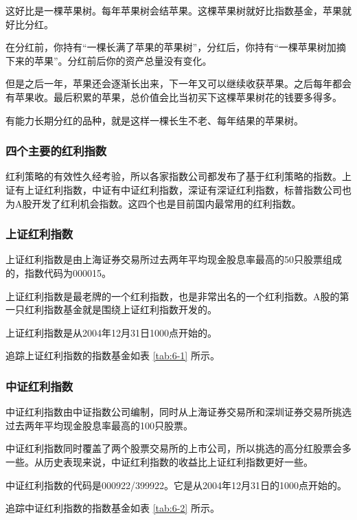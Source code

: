 这好比是一棵苹果树。每年苹果树会结苹果。这棵苹果树就好比指数基金，苹果就好比分红。

在分红前，你持有“一棵长满了苹果的苹果树”，分红后，你持有“一棵苹果树加摘下来的苹果”。分红前后你的资产总量没有变化。

但是之后一年，苹果还会逐渐长出来，下一年又可以继续收获苹果。之后每年都会有苹果收。最后积累的苹果，总价值会比当初买下这棵苹果树花的钱要多得多。

有能力长期分红的品种，就是这样一棵长生不老、每年结果的苹果树。

\subsubsection{四个主要的红利指数}

红利策略的有效性久经考验，所以各家指数公司都发布了基于红利策略的指数。上证有上证红利指数，中证有中证红利指数，深证有深证红利指数，标普指数公司也为A股开发了红利机会指数。这四个也是目前国内最常用的红利指数。

\subsubsection{上证红利指数}

上证红利指数是由上海证券交易所过去两年平均现金股息率最高的50只股票组成的，指数代码为000015。

上证红利指数是最老牌的一个红利指数，也是非常出名的一个红利指数。A股的第一只红利指数基金就是围绕上证红利指数开发的。

上证红利指数是从2004年12月31日1000点开始的。

追踪上证红利指数的指数基金如表 \ref{tab:6-1} 所示。



\subsubsection{中证红利指数}

中证红利指数由中证指数公司编制，同时从上海证券交易所和深圳证券交易所挑选过去两年平均现金股息率最高的100只股票。

中证红利指数同时覆盖了两个股票交易所的上市公司，所以挑选的高分红股票会多一些。从历史表现来说，中证红利指数的收益比上证红利指数更好一些。

中证红利指数的代码是000922/399922。它是从2004年12月31日的1000点开始的。

追踪中证红利指数的指数基金如表 \ref{tab:6-2} 所示。



